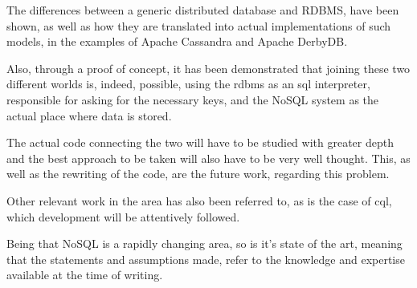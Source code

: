 \label{sec:conclusion}
The differences between a generic distributed database and RDBMS, have been shown, as well as how they are translated into actual implementations of such models, in the examples of Apache Cassandra and Apache DerbyDB.

Also, through a proof of concept, it has been demonstrated that joining these two different worlds is, indeed, possible, using the \ac{rdbms} as an \ac{sql}  interpreter, responsible for asking for the necessary keys, and the NoSQL system as the actual place where data is stored.

The actual code connecting the two will have to be studied with greater depth and the best approach to be taken will also have to be very well thought. This, as well as the rewriting of the code, are the future work, regarding this problem.

Other relevant work in the area has also been referred to, as is the case of \ac{cql}, which development will be attentively followed.

Being that NoSQL is a rapidly changing area, so is it's state of the art, meaning that the statements and assumptions made, refer to the knowledge and expertise available at the time of writing.